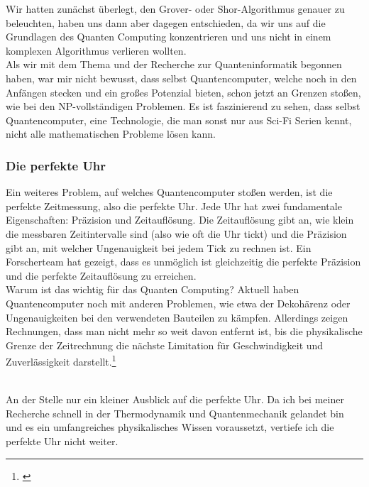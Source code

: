 \begin{tcolorbox}[title=Kommentar,
    title filled=false,
    colback=cyan!5!white,
    colframe=cyan!75!black]
    Wir hatten zunächst überlegt, den Grover- oder Shor-Algorithmus genauer zu beleuchten, haben uns dann aber dagegen entschieden,
    da wir uns auf die Grundlagen des Quanten Computing konzentrieren und uns nicht in einem komplexen Algorithmus verlieren wollten.\\

    Als wir mit dem Thema und der Recherche zur Quanteninformatik begonnen haben, war mir nicht bewusst, dass selbst Quantencomputer,
    welche noch in den Anfängen stecken und ein großes Potenzial bieten, schon jetzt an Grenzen stoßen, wie bei den NP-vollständigen Problemen.
    Es ist faszinierend zu sehen, dass selbst Quantencomputer, eine Technologie, die man sonst nur aus Sci-Fi Serien kennt, nicht alle mathematischen Probleme lösen kann.
\end{tcolorbox}

\subsubsection{Die perfekte Uhr}
\label{subsubsec:die-perfekte-uhr}
Ein weiteres Problem, auf welches Quantencomputer stoßen werden, ist die perfekte Zeitmessung, also die perfekte Uhr.
Jede Uhr hat zwei fundamentale Eigenschaften: Präzision und Zeitauflösung.
Die Zeitauflösung gibt an, wie klein die messbaren Zeitintervalle sind (also wie oft die Uhr tickt) und die Präzision gibt an, mit welcher Ungenauigkeit bei jedem Tick zu rechnen ist.
Ein Forscherteam hat gezeigt, dass es unmöglich ist gleichzeitig die perfekte Präzision und die perfekte Zeitauflösung zu erreichen.\\

Warum ist das wichtig für das Quanten Computing?
Aktuell haben Quantencomputer noch mit anderen Problemen, wie etwa der Dekohärenz oder Ungenauigkeiten bei den verwendeten Bauteilen zu kämpfen.
Allerdings zeigen Rechnungen, dass man nicht mehr so weit davon entfernt ist, bis die physikalische Grenze der Zeitrechnung die nächste Limitation für Geschwindigkeit und Zuverlässigkeit darstellt.\footnote{\cite{tuwien_grenzen_2023}}\\\\

\begin{tcolorbox}[title=Kommentar,
    title filled=false,
    colback=cyan!5!white,
    colframe=cyan!75!black]
    An der Stelle nur ein kleiner Ausblick auf die perfekte Uhr.
    Da ich bei meiner Recherche schnell in der Thermodynamik und Quantenmechanik gelandet bin und es ein umfangreiches physikalisches Wissen voraussetzt, vertiefe ich die perfekte Uhr nicht weiter.
\end{tcolorbox}


